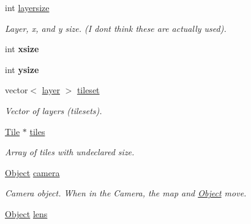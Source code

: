 \begin{DoxyCompactItemize}
\item 
int \hyperlink{classTilesettmp_a9a24c245c8ba4ae85c9e0c386f06c067}{layersize}\hypertarget{classTilesettmp_a9a24c245c8ba4ae85c9e0c386f06c067}{}\label{classTilesettmp_a9a24c245c8ba4ae85c9e0c386f06c067}

\begin{DoxyCompactList}\small\item\em Layer, x, and y size. (I don\textquotesingle{}t think these are actually used). \end{DoxyCompactList}\item 
int {\bfseries xsize}\hypertarget{classTilesettmp_a76e24cfbfaa6de33f656c88387b7047c}{}\label{classTilesettmp_a76e24cfbfaa6de33f656c88387b7047c}

\item 
int {\bfseries ysize}\hypertarget{classTilesettmp_a7f4457389bc5feacc1513db170f66d50}{}\label{classTilesettmp_a7f4457389bc5feacc1513db170f66d50}

\item 
vector$<$ \hyperlink{structTilesettmp_1_1layer}{layer} $>$ \hyperlink{classTilesettmp_aeeb7bfd9354dc2afe1fb2b2ca7e81530}{tileset}\hypertarget{classTilesettmp_aeeb7bfd9354dc2afe1fb2b2ca7e81530}{}\label{classTilesettmp_aeeb7bfd9354dc2afe1fb2b2ca7e81530}

\begin{DoxyCompactList}\small\item\em Vector of layers (tilesets). \end{DoxyCompactList}\item 
\hyperlink{classTile}{Tile} $\ast$ \hyperlink{classTilesettmp_a18b2ac54dc47b31f651437787594ef55}{tiles}\hypertarget{classTilesettmp_a18b2ac54dc47b31f651437787594ef55}{}\label{classTilesettmp_a18b2ac54dc47b31f651437787594ef55}

\begin{DoxyCompactList}\small\item\em Array of tiles with undeclared size. \end{DoxyCompactList}\item 
\hyperlink{classObject}{Object} \hyperlink{classTilesettmp_a7c08364af26a0c6a4f9b2c178442a317}{camera}\hypertarget{classTilesettmp_a7c08364af26a0c6a4f9b2c178442a317}{}\label{classTilesettmp_a7c08364af26a0c6a4f9b2c178442a317}

\begin{DoxyCompactList}\small\item\em Camera object. When in the Camera, the map and \hyperlink{classObject}{Object} move. \end{DoxyCompactList}\item 
\hyperlink{classObject}{Object} \hyperlink{classTilesettmp_a17c54918a5f571e2cbedb0d03f67ac03}{lens}\hypertarget{classTilesettmp_a17c54918a5f571e2cbedb0d03f67ac03}{}\label{classTilesettmp_a17c54918a5f571e2cbedb0d03f67ac03}


\end{DoxyCompactItemize}
